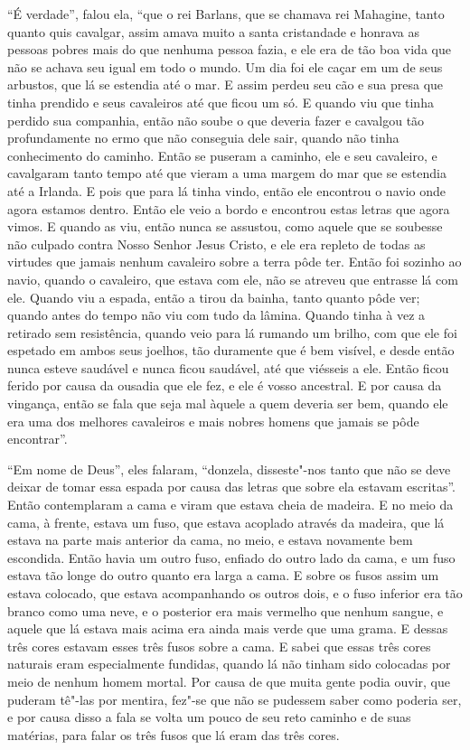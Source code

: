 “É verdade”, falou ela, “que o rei Barlans, que se chamava rei Mahagine, tanto
quanto quis cavalgar, assim amava muito a santa cristandade e honrava as
pessoas pobres mais do que nenhuma pessoa fazia, e ele era de tão boa vida que
não se achava seu igual em todo o mundo. Um dia foi ele caçar em um de seus
arbustos, que lá se estendia até o mar. E assim perdeu seu cão e sua presa que
tinha prendido e seus cavaleiros até que ficou um só. E quando viu que
tinha perdido sua companhia, então não soube o que deveria fazer e cavalgou tão
profundamente no ermo que não conseguia dele sair, quando não tinha
conhecimento do caminho. Então se puseram a caminho, ele e seu cavaleiro, e
cavalgaram tanto tempo até que vieram a uma margem do mar que se estendia até a
Irlanda. E pois que para lá tinha vindo, então ele encontrou o navio onde agora
estamos dentro. Então ele veio a bordo e encontrou estas letras que agora
vimos. E quando as viu, então nunca se assustou, como aquele que se soubesse
não culpado contra Nosso Senhor Jesus Cristo, e ele era repleto de todas as
virtudes que jamais nenhum cavaleiro sobre a terra pôde ter. Então foi
sozinho ao navio, quando o cavaleiro, que estava com ele, não se atreveu que
entrasse lá com ele. Quando viu a espada, então a tirou da bainha, tanto quanto
pôde ver; quando antes do tempo não viu com tudo da lâmina. Quando tinha à vez
a retirado sem resistência, quando veio para lá rumando um brilho, com que ele
foi espetado em ambos seus joelhos, tão duramente que é bem visível, e desde
então nunca esteve saudável e nunca ficou saudável, até que viésseis a ele.
Então ficou ferido por causa da ousadia que ele fez, e ele é vosso ancestral. E
por causa da vingança, então se fala que seja mal àquele a quem deveria ser
bem, quando ele era uma dos melhores cavaleiros e mais nobres homens que jamais
se pôde encontrar”. 

“Em nome de Deus”, eles falaram, “donzela, disseste"-nos tanto que não se deve
deixar de tomar essa espada por causa das letras que sobre ela estavam
escritas”. Então contemplaram a cama e viram que estava cheia de madeira. E no
meio da cama, à frente, estava um fuso, que estava acoplado através da madeira,
que lá estava na parte mais anterior da cama, no meio, e estava novamente bem
escondida. Então havia um outro fuso, enfiado do outro lado da cama, e um fuso
estava tão longe do outro quanto era larga a cama. E sobre os fusos assim um
estava colocado, que estava acompanhando os outros dois, e o fuso inferior era
tão branco como uma neve, e o posterior era mais vermelho que nenhum sangue, e
aquele que lá estava mais acima era ainda mais verde que uma grama. E dessas
três cores estavam esses três fusos sobre a cama. E sabei que essas três cores
naturais eram especialmente fundidas, quando lá não tinham sido colocadas por
meio de nenhum homem mortal. Por causa de que muita gente podia ouvir, que
puderam tê"-las por mentira, fez"-se que não se pudessem saber como poderia ser,
e por causa disso a fala se volta um pouco de seu reto caminho e de suas
matérias, para falar os três fusos que lá eram das três cores. 

